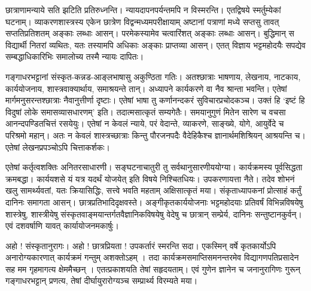 छात्राणामन्याये सति झटिति प्रतिरुध्नन्ति। न्यायदापनपर्यन्तमपि न विस्मरन्ति। एतद्विषये स्मर्तुम्येकां घटनाम्। व्याकरणशास्त्रस्य एकेन छात्रेण विद्वन्मध्यमपरीक्षायाम् अष्टानां पत्राणां मध्ये सप्तसु तावत् सप्ततिप्रतिशतम् अङ्काः लब्धाः आसन्। परमेकस्यामेव चत्वारिंशत् अङ्काः लब्धाः आसन्। बुद्धिमान् स विद्यार्थी नितरां व्यथितः, यतः तस्यामपि अधिकाः अङ्काः प्राप्तव्या आसन्। एतत् विज्ञाय भट्टमहोदयैः सपद्येव सम्बद्धाधिकारिभिः समालोच्य तस्मै न्यायः दापितः। 

गङ्गाधरभट्टानां संस्कृत-कन्नड-आङ्लभाषासु अकुण्ठिता गतिः। अतश्छात्राः भाषणाय, लेखनाय, नाटकाय, कार्ययोजनाय, शास्त्रवाक्यार्थाय, समाश्रयन्ते तान्। अध्यापने कार्यकरणे वा नैव श्रान्ता भवन्ति। एतेषां मार्गमनुसरन्तश्छात्राः नैवानुत्तीर्णा दृष्टाः। एतेषां भाषा तु कर्णानन्दकरं सुविचारप्रचोदकञ्च। उक्तं हि ‘इष्टं हि विदुषां लोके समासव्यासधारणम्’ इति। तदात्मसात्कृतं सम्यगेतैः। समयानुगुणं मितेन सारेण च वचसा आनन्दपण्डितचित्तं रसयेयुः। एतेषां न केवलं न्याये, परं वेदान्ते, व्याकरणे, साङ्ख्ये, योगे, आयुर्वेदे च परिश्रमो महान्। अतः न केवलं शास्त्रच्छात्राः किन्तु पौरजनपदैः वैदेहिकैश्च ज्ञानार्थमशिश्रियन् आश्रयन्ति च। एतेषां लेखनप्रपञ्चोऽपि चित्ताकर्शकः। 

एतेषां कर्तृत्वशक्तिः अनितरसाधारणी। सङ्घटनाचातुरी तु सर्वथानुसारणीययोग्या। कार्यक्रमस्य पूर्वसिद्धता क्रमबद्धा। कार्ययशसे यं यत्र यदर्थं योजयेत् इति विषये निश्चितधियः। उपकरणायत्ता नैते। तदेव शोभनं खलु सामर्थ्यवतां, यतः क्रियासिद्धिः, सत्त्वे भवति महताम् अक्षिसात्कृतं मया। संकृताध्यापकनां प्रोत्साहं कर्तुं दानिनः समागता आसन्। छात्रप्रतिभादिदृक्षवस्ते। अङ्गीकृतकार्ययोजनाः भट्टमहोदयाः प्रतिवर्षं विभिन्नविषयेषु शास्त्रेषु, शास्त्रीयेषु  संस्कृतवाङ्मयान्तर्गतवैज्ञानिकविषयेषु वेदेषु च छात्रान् सम्प्रेर्य, दानिनः सन्तुष्टानकुर्वन्। एवं दशवर्षाणि यावत् कार्यायोजनमकार्षुः। 

अहो ! संस्कृतानुरागः। अहो ! छात्रप्रियता ! उपकर्तारं स्मरन्ति सदा। एकस्मिन् वर्षे कृतकार्योऽपि अनारोग्यकारणात् कार्यक्रमं गन्तुम् अशक्तोऽहम् । तदा कार्यक्रमसमाप्तिसमनन्तरमेव विद्यागणपतिप्रसादेन सह मम गृहमागत्य क्षेममैच्छन् । एतत्प्रकाशयति तेषां सहृदयताम्। एवं गुणेन ज्ञानेन च जनानुरागिणः गुरून् गङ्गाधरभट्टान् प्रणत्य, तेषां दीर्घायुरारोग्यञ्च सम्प्रार्थ्य विरम्यते मया।  

\articleend

